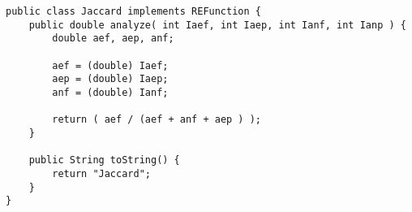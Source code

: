 \begin{lstlisting}
public class Jaccard implements REFunction {
	public double analyze( int Iaef, int Iaep, int Ianf, int Ianp ) {
		double aef, aep, anf;
		
		aef = (double) Iaef;
		aep = (double) Iaep;
		anf = (double) Ianf;
		
		return ( aef / (aef + anf + aep ) );
	}

	public String toString() {
		return "Jaccard";
	}
}
\end{lstlisting}
